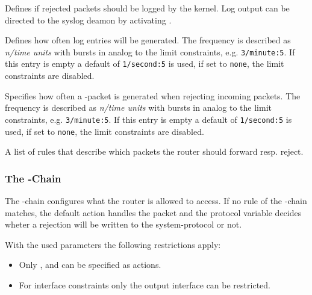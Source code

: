 \begin{description}
Defines if rejected packets should be logged by the kernel.
Log output can be directed to the syslog deamon by activating .

Defines how often log entries will be generated. The frequency is described
as \emph{n/time units} with bursts in analog to the limit constraints, e.g.
\texttt{3/minute:5}. If this entry is empty a default of \texttt{1/second:5}
is used, if set to \texttt{none}, the limit constraints are disabled.

Specifies how often a -packet is generated when rejecting
incoming packets. The frequency is described as \emph{n/time units} with bursts 
in analog to the limit constraints, e.g. \texttt{3/minute:5}. If this entry is
empty a default of \texttt{1/second:5} is used, if set to \texttt{none},
the limit constraints are disabled.

A list of rules that describe which packets the router should forward resp. reject.

\end{description}

\subsubsection{The -Chain}

The -chain configures what the router is allowed to access. 
If no rule of the -chain matches,
the default action handles the packet and the protocol variable decides
wheter a rejection will be written to the system-protocol or not.

With the used parameters the following restrictions apply:
\begin{itemize}
  \item Only ,  and 
    can be specified as actions.
  \item For interface constraints only the output interface can
    be restricted.
\end{itemize}


